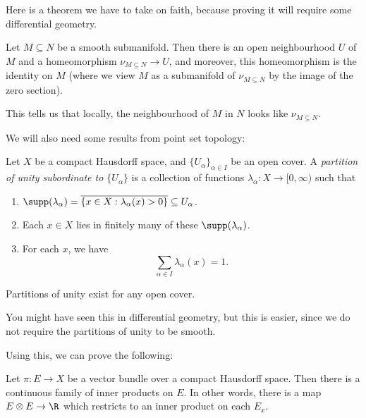 \documentclass[a4paper]{article}
\theoremstyle{definition}
\begin{document}
Here is a theorem we have to take on faith, because proving it will require some differential geometry.
\begin{thm}
  Let $M \subseteq N$ be a smooth submanifold. Then there is an open neighbourhood $U$ of $M$ and a homeomorphism $\nu_{M \subseteq N} \to U$, and moreover, this homeomorphism is the identity on $M$ (where we view $M$ as a submanifold of $\nu_{M \subseteq N}$ by the image of the zero section).
\end{thm}
This tells us that locally, the neighbourhood of $M$ in $N$ looks like $\nu_{M \subseteq N}$.

We will also need some results from point set topology:
\begin{defi}
  Let $X$ be a compact Hausdorff space, and $\{U_\alpha\}_{\alpha \in I}$ be an open cover. A \emph{partition of unity subordinate to $\{U_\alpha\}$} is a collection of functions $\lambda_\alpha: X \to [0, \infty)$ such that
  \begin{enumerate}
    \item $\supp(\lambda_\alpha) = \overline{\{x \in X: \lambda_\alpha(x) > 0\}} \subseteq U_\alpha$.
    \item Each $x \in X$ lies in finitely many of these $\supp (\lambda_\alpha)$.
    \item For each $x$, we have
      \[
        \sum_{\alpha \in I}\lambda_\alpha(x) = 1.
      \]
  \end{enumerate}
\end{defi}

\begin{prop}
  Partitions of unity exist for any open cover.
\end{prop}

You might have seen this in differential geometry, but this is easier, since we do not require the partitions of unity to be smooth.

Using this, we can prove the following:
\begin{lemma}
  Let $\pi: E \to X$ be a vector bundle over a compact Hausdorff space. Then there is a continuous family of inner products on $E$. In other words, there is a map $E \otimes E \to \R$ which restricts to an inner product on each $E_x$.
\end{lemma}
\end{document}
